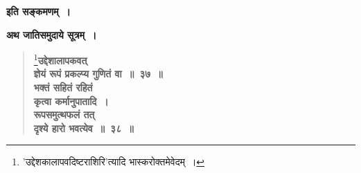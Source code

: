\documentclass[11pt, openany]{book}
\begin{document}
\begin{sloppypar}
\begin{center}
\textbf{इति सङ्कमणम्~।}\\
\vspace{6mm}

{\Large \textbf{अथ जातिसमुदाये सूत्रम्~।}}
\end{center}
\vspace{-3mm}

 \label{1.38}
\begin{quote}
\renewcommand{\thefootnote}{२}\footnote{{\color{violet}'उद्देशकालापवदिष्टराशिरि'}त्यादि {\color{violet}भास्करो}क्तमेवेदम्~।}{\large \textbf{{\color{purple}उद्देशालापकवत् \\
ज्ञेयं रूपं प्रकल्प्य गुणितं वा~॥~३७~॥ \\
भक्तं सहितं रहितं \\
कृत्वा कर्मानुपातादि~।\\ 
रूपसमुत्थफलं तत् \\
दृश्ये हारो भवत्येव~॥~३८~॥}}}
\end{quote}
\end{sloppypar}

\newpage
\end{document}
